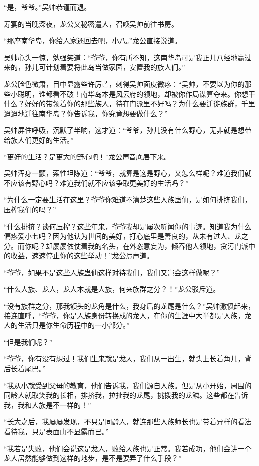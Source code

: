 \begin{this_body}
“是，爷爷。”吴帅恭谨而退。

寿宴的当晚深夜，龙公又秘密遣人，召唤吴帅前往书房。

“那座南华岛，你给人家还回去吧，小八。”龙公直接说道。

吴帅心头一惊，勉强笑道：“爷爷，你有所不知，这南华岛可是我正儿八经地赢过来的，孙儿可计划着要将此岛当做家园，安置我的族人们。”

龙公脸色微肃，目中显露些许厉芒，刺得吴帅面皮微疼：“吴帅，不要以为你的那些小聪明，谁都看不破！南华岛本是风云府的领地，却被你作局谋算夺来。你想干什么？好好的带领着你的那些族人，待在门派里不好吗？为什么要迁徙族群，千里迢迢地迁往南华岛？你告诉我，你究竟想要做什么？”

吴帅屏住呼吸，沉默了半晌，这才道：“爷爷，孙儿没有什么野心，无非就是想带给族人们更好的生活。”

“更好的生活？是更大的野心吧！”龙公声音底层下来。

吴帅浑身一颤，索性坦陈道：“爷爷，就算是这是野心，又怎么样呢？难道我们就不应该有野心吗？难道我们就不应该争取更美好的生活吗？”

“为什么一定要生活在这里？爷爷你难道不清楚这些人族蛊仙，是如何排挤我们，压榨我们的吗？”

“什么排挤？谈何压榨？这些年来，爷爷我却是屡次听闻你的事迹。知道我为什么偏疼爱小七吗？因为他认为世间的美好，打心底里是善良的，从未有过人、龙之分。而你呢？却屡屡依仗着我的名头，在外恣意妄为，倾吞他人领地，贪污门派中的收益，速速停止你的这些举动！”龙公厉声道。

“爷爷，如果不是这些人族蛊仙这样对待我们，我们又岂会这样做呢？”

“什么人族、龙人，龙人本就是人族，何来族群之分？！”龙公驳斥道。

“没有族群之分，那我额头的龙角是什么，我身后的龙尾是什么？”吴帅激愤起来，接连直呼，“爷爷，你是人族身份转换成的龙人，在你的生涯中大半都是人族，龙人的生活只是你生命历程中的一小部分。”

“但是我们呢？”

“爷爷，你有没有想过！我们生来就是龙人，我们从一出生，就头上长着角儿，背后长着尾巴。”

“我从小就受到父母的教育，他们告诉我，我们源自人族。但是从小开始，周围的同龄人就取笑我的长相，排挤我，拉扯我的龙尾，挑拨我的龙鳞。这些都在告诉我，我和人族是不一样的！”

“长大之后，我屡屡发现，不只是同龄人，就连那些人族师长也是带着异样的看法看待我，只是表面山不显露而已。”

“我若是失败，他们会说这是龙人，败给人族也是正常。我若成功，他们会讲一个龙人居然能够做到这样的地步，是不是耍弄了什么手段？”


\end{this_body}

